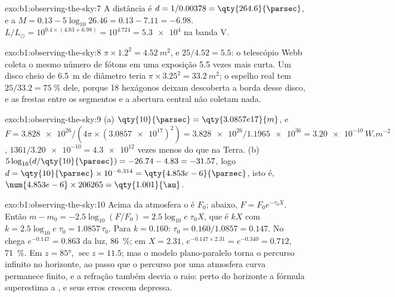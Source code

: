 \begin{solution}{exo:b1:observing-the-sky:7}
A distância é $d = 1/0.00378 = \qty{264.6}{\parsec}$, e a  $M = 0.13 - 5\log_{10}26.46 = 0.13 - 7.11 = -6.98$. $L/L_\odot = 10^{0.4\times(4.83 + 6.98)} =
10^{4.724} = \num{5.3e4}$ na banda V.
\end{solution}

\begin{solution}{exo:b1:observing-the-sky:8}
$\pi\times1.2^2 = \qty{4.52}{m^2}$, e $25/4.52 = 5.5$: o telescópio Webb
coleta o mesmo número de fótons em uma exposição 5.5 vezes mais curta. Um
disco cheio de \qty{6.5}{m} de diâmetro teria $\pi\times3.25^2 = \qty{33.2}{m^2}$;
o espelho real tem $25/33.2 = \qty{75}{\percent}$ dele, porque 18 hexágonos
deixam descoberta a borda desse disco, e as frestas entre os segmentos e a
abertura central não coletam nada.
\end{solution}

\begin{solution}{exo:b1:observing-the-sky:9}
(a) $\qty{10}{\parsec} = \qty{3.0857e17}{m}$, e $F = \num{3.828e26}/(4\pi
\times(\num{3.0857e17})^2) = \num{3.828e26}/\num{1.1965e36} =
\qty{3.20e-10}{W.m^{-2}}$, $1361/\num{3.20e-10} = \num{4.3e12}$ vezes menos do que na
Terra.
(b) $5\log_{10}(d/\qty{10}{\parsec}) = -26.74 - 4.83 = -31.57$, logo
$d = \qty{10}{\parsec}\times10^{-6.314} = \qty{4.853e-6}{\parsec}$, isto é,
$\num{4.853e-6}\times206265 = \qty{1.001}{\au}$.
\end{solution}

\begin{solution}{exo:b1:observing-the-sky:10}
Acima da atmosfera o  é $F_0$; abaixo, $F = F_0e^{-\tau_0X}$. Então
$m - m_0 = -2.5\log_{10}(F/F_0) = 2.5\log_{10}e\;\tau_0X$, que é $kX$ com
$k = 2.5\log_{10}e\;\tau_0 = 1.0857\,\tau_0$. Para $k = 0.160$:
$\tau_0 = 0.160/1.0857 = 0.147$. No  chega $e^{-0.147} = 0.863$ da
luz, \qty{86}{\percent}; em $X = 2.31$, $e^{-0.147\times2.31} =
e^{-0.340} = 0.712$, \qty{71}{\percent}. Em $z = \ang{85}$, $\sec z =
11.5$; mas o modelo plano-paralelo torna o percurso infinito no horizonte,
ao passo que o percurso por uma atmosfera curva permanece finito, e a refração
também desvia o raio: perto do horizonte a fórmula superestima a
, e seus erros crescem depressa.
\end{solution}

